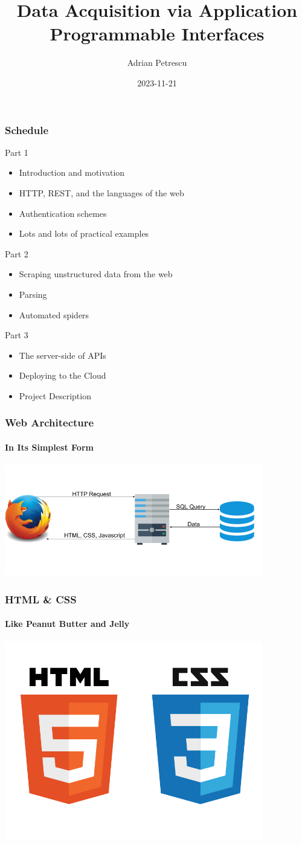 \documentclass[dvipsnames]{beamer}
\title[Data Acquisition via APIs]{Data Acquisition via Application Programmable Interfaces}
\author{Adrian Petrescu}
\institute{Kinaxis}
\date{2023-11-21}
\begin{document}
\frame{\titlepage}


\begin{frame}
  \frametitle{Schedule}
  
  Part 1
  \begin{itemize}
    \item Introduction and motivation
    \item HTTP, REST, and the languages of the web
    \item Authentication schemes
    \item Lots and lots of practical examples
  \end{itemize}

  \alert{Part 2}
  \begin{itemize}
    \item Scraping unstructured data from the web
    \item Parsing 
    \item Automated spiders
  \end{itemize}

  Part 3
  \begin{itemize}
    \item The server-side of APIs
    \item Deploying to the Cloud
    \item Project Description
  \end{itemize}
\end{frame}


\begin{frame}
  \frametitle{Web Architecture}
  \framesubtitle{In Its Simplest Form}
  \includegraphics[width=320pt]{img/web-architecture-1.png}
\end{frame}


\begin{frame}
  \frametitle{HTML \& CSS}
  \framesubtitle{Like Peanut Butter and Jelly}
  \includegraphics[width=320pt]{img/html-css.png}
\end{frame}
\end{document}
